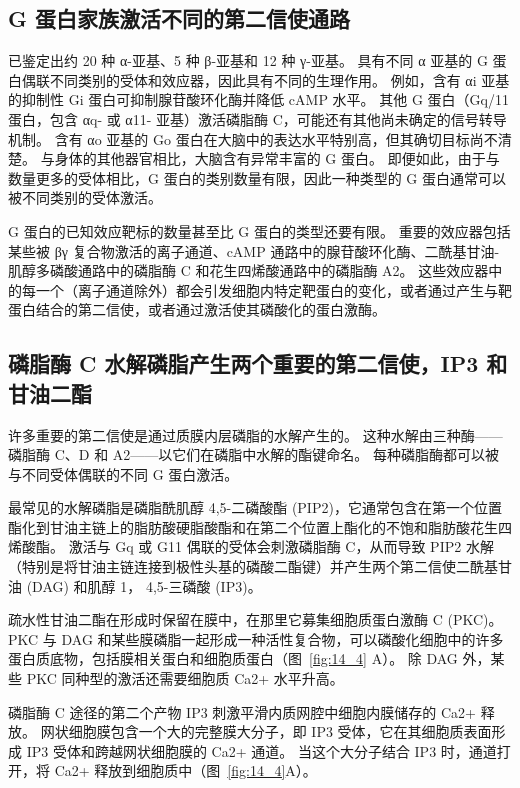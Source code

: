 \subsection{G 蛋白家族激活不同的第二信使通路}

已鉴定出约 20 种 α-亚基、5 种 β-亚基和 12 种 γ-亚基。
具有不同 α 亚基的 G 蛋白偶联不同类别的受体和效应器，因此具有不同的生理作用。
例如，含有 αi 亚基的抑制性 Gi 蛋白可抑制腺苷酸环化酶并降低 cAMP 水平。
其他 G 蛋白（Gq/11 蛋白，包含 αq- 或 α11- 亚基）激活磷脂酶 C，可能还有其他尚未确定的信号转导机制。
含有 αo 亚基的 Go 蛋白在大脑中的表达水平特别高，但其确切目标尚不清楚。
与身体的其他器官相比，大脑含有异常丰富的 G 蛋白。
即便如此，由于与数量更多的受体相比，G 蛋白的类别数量有限，因此一种类型的 G 蛋白通常可以被不同类别的受体激活。


G 蛋白的已知效应靶标的数量甚至比 G 蛋白的类型还要有限。
重要的效应器包括某些被 βγ 复合物激活的离子通道、cAMP 通路中的腺苷酸环化酶、二酰基甘油-肌醇多磷酸通路中的磷脂酶 C 和花生四烯酸通路中的磷脂酶 A2。
这些效应器中的每一个（离子通道除外）都会引发细胞内特定靶蛋白的变化，或者通过产生与靶蛋白结合的第二信使，或者通过激活使其磷酸化的蛋白激酶。



\subsection{磷脂酶 C 水解磷脂产生两个重要的第二信使，IP3 和甘油二酯}

许多重要的第二信使是通过质膜内层磷脂的水解产生的。 
这种水解由三种酶——磷脂酶 C、D 和 A2——以它们在磷脂中水解的酯键命名。
每种磷脂酶都可以被与不同受体偶联的不同 G 蛋白激活。


最常见的水解磷脂是磷脂酰肌醇 4,5-二磷酸酯 (PIP2)，它通常包含在第一个位置酯化到甘油主链上的脂肪酸硬脂酸酯和在第二个位置上酯化的不饱和脂肪酸花生四烯酸酯。
激活与 Gq 或 G11 偶联的受体会刺激磷脂酶 C，从而导致 PIP2 水解（特别是将甘油主链连接到极性头基的磷酸二酯键）并产生两个第二信使二酰基甘油 (DAG) 和肌醇 1， 4,5-三磷酸 (IP3)。


疏水性甘油二酯在形成时保留在膜中，在那里它募集细胞质蛋白激酶 C (PKC)。
PKC 与 DAG 和某些膜磷脂一起形成一种活性复合物，可以磷酸化细胞中的许多蛋白质底物，包括膜相关蛋白和细胞质蛋白（图~\ref{fig:14_4} A）。
除 DAG 外，某些 PKC 同种型的激活还需要细胞质 Ca2+ 水平升高。


磷脂酶 C 途径的第二个产物 IP3 刺激平滑内质网腔中细胞内膜储存的 Ca2+ 释放。
网状细胞膜包含一个大的完整膜大分子，即 IP3 受体，它在其细胞质表面形成 IP3 受体和跨越网状细胞膜的 Ca2+ 通道。
当这个大分子结合 IP3 时，通道打开，将 Ca2+ 释放到细胞质中（图~\ref{fig:14_4}A）。


